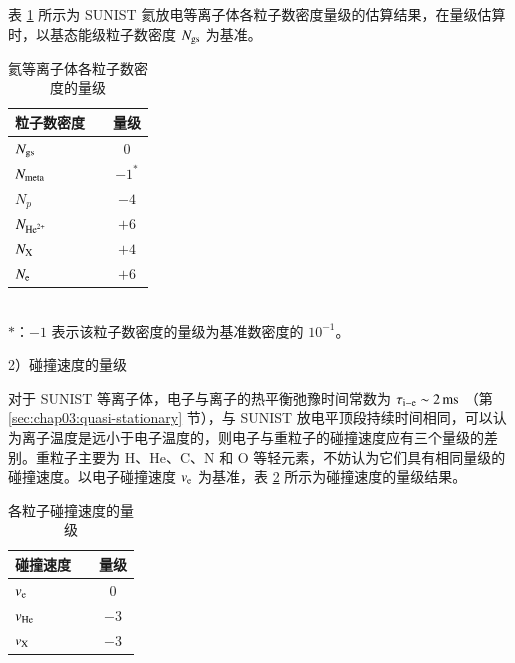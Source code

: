 表 \ref{table:chap03:N-gusuan} 所示为 SUNIST 氦放电等离子体各粒子数密度量级的估算结果，在量级估算时，以基态能级粒子数密度 $N_{\rm gs}$ 为基准。

\begin{table}%
\caption{氦等离子体各粒子数密度的量级}
\label{table:chap03:N-gusuan}
\begin{center}
\begin{tabular}{lcc}\toprule[1.5pt]
粒子数密度 & & 量级 \\
\midrule[1pt]
\hspace{1.5em}$N_{\rm gs}$ & & \hspace{0.5em}$0$ \\
\hspace{1.5em}$N_{\rm meta}$ & & \hspace{0.5em}$-1^{*}$ \\
\hspace{1.5em}$N_p$ & & $-4$ \\
\hspace{1.5em}$N_{{\rm He}^{2+}}$ & & $+6$ \\
\hspace{1.5em}$N_{\rm X}$ & & $+4$ \\
\hspace{1.5em}$N_{\rm e}$ & & $+6$\\
\bottomrule[1.5pt]
\end{tabular}\\[0.5em]
{\small$*$：$-1$ 表示该粒子数密度的量级为基准数密度的 $10^{-1}$。}
\end{center}
\end{table}

2）碰撞速度的量级

对于 SUNIST 等离子体，电子与离子的热平衡弛豫时间常数为 $\tau_{\rm i-e}\sim2\,{\rm ms}$ （第 \ref{sec:chap03:quasi-stationary} 节），与 SUNIST 放电平顶段持续时间相同，可以认为离子温度是远小于电子温度的，则电子与重粒子的碰撞速度应有三个量级的差别。重粒子主要为 H、He、C、N 和 O 等轻元素，不妨认为它们具有相同量级的碰撞速度。以电子碰撞速度 $v_{\rm e}$ 为基准，表 \ref{table:chap03:v-gusuan} 所示为碰撞速度的量级结果。

\begin{table}%
\caption{各粒子碰撞速度的量级}
\label{table:chap03:v-gusuan}
\begin{center}
\begin{tabular}{lcc}\toprule[1.5pt]
碰撞速度 & & 量级 \\
\midrule[1pt]
\hspace{1.5em}$v_{\rm e}$ & & \hspace{0.5em}$0$ \\
\hspace{1.5em}$v_{\rm He}$ & & $-3$ \\
\hspace{1.5em}$v_{\rm X}$ & & $-3$ \\
\bottomrule[1.5pt]
\end{tabular}
\end{center}
\end{table}

